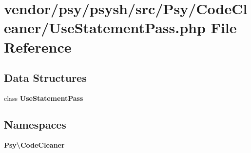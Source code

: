 \section{vendor/psy/psysh/src/\+Psy/\+Code\+Cleaner/\+Use\+Statement\+Pass.php File Reference}
\label{_use_statement_pass_8php}
\subsection*{Data Structures}
\begin{DoxyCompactItemize}
\item 
class {\bf Use\+Statement\+Pass}
\end{DoxyCompactItemize}
\subsection*{Namespaces}
\begin{DoxyCompactItemize}
\item 
 {\bf Psy\textbackslash{}\+Code\+Cleaner}
\end{DoxyCompactItemize}
